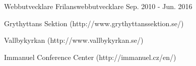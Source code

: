 \begin{cventries}
  \cventry
    {Webbutvecklare} %
    {Frilanswebbutvecklare} %
    {} %
    {Sep. 2010 - Jun. 2016} %
    {
      \begin{cvitems} %
        \item {Grythyttans Sektion (http://www.grythyttanssektion.se/)}
        \item {Vallbykyrkan (http://www.vallbykyrkan.se/)}
        \item {Immanuel Conference Center (http://immanuel.cz/en/)}
      \end{cvitems}
    }





\end{cventries}
